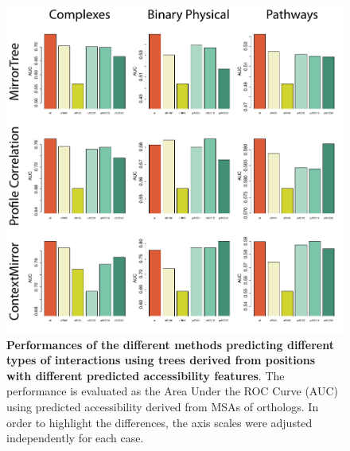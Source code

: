 \begin{figure}[htbp]
\centering
\includegraphics[keepaspectratio,width=\textwidth,height=0.75\textheight]{../figures/accsROCs_orthologs_scaled.pdf}
\caption{\textbf{Performances of the different methods predicting different types of interactions using trees derived from positions with different predicted accessibility features}. The performance is evaluated as the Area Under the ROC Curve (AUC) using predicted accessibility derived from MSAs of orthologs. In order to highlight the differences, the axis scales were adjusted independently for each case.}
\label{accsrocs_orthologs_scaled.pdf}
\end{figure}

